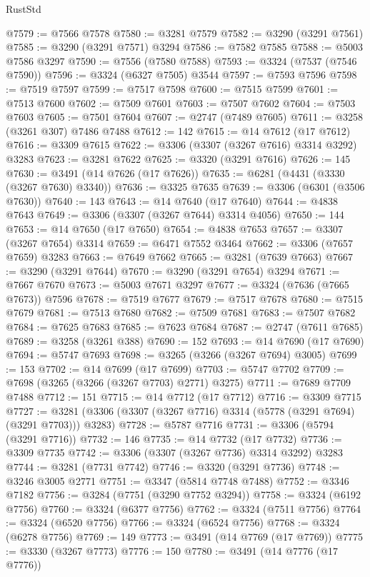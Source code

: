 \begin{lexlean}{RustStd}
\begin{coremodule}
@7579 := @7566 @7578
@7580 := @3281 @7579
@7582 := @3290 (@3291 @7561)
@7585 := @3290 (@3291 @7571) @3294
@7586 := @7582 @7585
@7588 := @5003 @7586 @3297
@7590 := @7556 (@7580 @7588)
@7593 := @3324 (@7537 (@7546 @7590))
@7596 := @3324 (@6327 @7505) @3544
@7597 := @7593 @7596
@7598 := @7519 @7597
@7599 := @7517 @7598
@7600 := @7515 @7599
@7601 := @7513 @7600
@7602 := @7509 @7601
@7603 := @7507 @7602
@7604 := @7503 @7603
@7605 := @7501 @7604
@7607 := @2747 (@7489 @7605)
@7611 := @3258 (@3261 @307) @7486 @7488
@7612 := 142
@7615 := @14 @7612 (@17 @7612)
@7616 := @3309 @7615
@7622 := @3306 (@3307 (@3267 @7616) @3314 @3292) @3283
@7623 := @3281 @7622
@7625 := @3320 (@3291 @7616)
@7626 := 145
@7630 := @3491 (@14 @7626 (@17 @7626))
@7635 := @6281 (@4431 (@3330 (@3267 @7630) @3340))
@7636 := @3325 @7635
@7639 := @3306 (@6301 (@3506 @7630))
@7640 := 143
@7643 := @14 @7640 (@17 @7640)
@7644 := @4838 @7643
@7649 := @3306 (@3307 (@3267 @7644) @3314 @4056)
@7650 := 144
@7653 := @14 @7650 (@17 @7650)
@7654 := @4838 @7653
@7657 := @3307 (@3267 @7654) @3314
@7659 := @6471 @7552 @3464
@7662 := @3306 (@7657 @7659) @3283
@7663 := @7649 @7662
@7665 := @3281 (@7639 @7663)
@7667 := @3290 (@3291 @7644)
@7670 := @3290 (@3291 @7654) @3294
@7671 := @7667 @7670
@7673 := @5003 @7671 @3297
@7677 := @3324 (@7636 (@7665 @7673)) @7596
@7678 := @7519 @7677
@7679 := @7517 @7678
@7680 := @7515 @7679
@7681 := @7513 @7680
@7682 := @7509 @7681
@7683 := @7507 @7682
@7684 := @7625 @7683
@7685 := @7623 @7684
@7687 := @2747 (@7611 @7685)
@7689 := @3258 (@3261 @388)
@7690 := 152
@7693 := @14 @7690 (@17 @7690)
@7694 := @5747 @7693
@7698 := @3265 (@3266 (@3267 @7694) @3005)
@7699 := 153
@7702 := @14 @7699 (@17 @7699)
@7703 := @5747 @7702
@7709 := @7698 (@3265 (@3266 (@3267 @7703) @2771) @3275)
@7711 := @7689 @7709 @7488
@7712 := 151
@7715 := @14 @7712 (@17 @7712)
@7716 := @3309 @7715
@7727 := @3281 (@3306 (@3307 (@3267 @7716) @3314 (@5778 (@3291 @7694) (@3291 @7703))) @3283)
@7728 := @5787 @7716
@7731 := @3306 (@5794 (@3291 @7716))
@7732 := 146
@7735 := @14 @7732 (@17 @7732)
@7736 := @3309 @7735
@7742 := @3306 (@3307 (@3267 @7736) @3314 @3292) @3283
@7744 := @3281 (@7731 @7742)
@7746 := @3320 (@3291 @7736)
@7748 := @3246 @3005 @2771
@7751 := @3347 (@5814 @7748 @7488)
@7752 := @3346 @7182
@7756 := @3284 (@7751 (@3290 @7752 @3294))
@7758 := @3324 (@6192 @7756)
@7760 := @3324 (@6377 @7756)
@7762 := @3324 (@7511 @7756)
@7764 := @3324 (@6520 @7756)
@7766 := @3324 (@6524 @7756)
@7768 := @3324 (@6278 @7756)
@7769 := 149
@7773 := @3491 (@14 @7769 (@17 @7769))
@7775 := @3330 (@3267 @7773)
@7776 := 150
@7780 := @3491 (@14 @7776 (@17 @7776))

\end{coremodule}
\end{lexlean}
